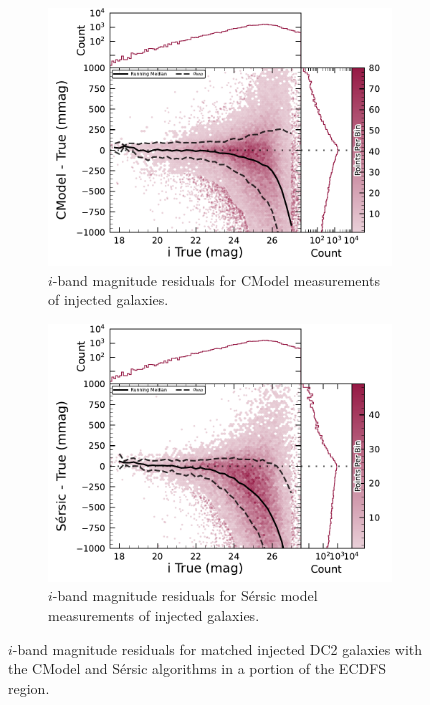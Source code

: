\begin{figure}[hbt!]
  \centering
  \begin{subfigure}[t]{0.45\textwidth}
  \includegraphics[width=\linewidth]{injected_lsst_cells_v1_5063_i_mag_cmodel}
  \caption{$i$-band magnitude residuals for CModel measurements of injected galaxies.}
  \end{subfigure}\hfill
  \begin{subfigure}[t]{0.45\textwidth}
  \includegraphics[width=\linewidth]{injected_lsst_cells_v1_5063_i_mag_sersic}
  \caption{$i$-band magnitude residuals for S\'ersic model measurements of injected galaxies.}
  \end{subfigure}\hfill
\caption{$i$-band magnitude residuals for matched injected DC2 galaxies with the CModel and S\'ersic algorithms in a portion of the \gls{ECDFS} region.}
\label{fig:injected_lsst_cells_v1_5063_i_mag}
\end{figure}

